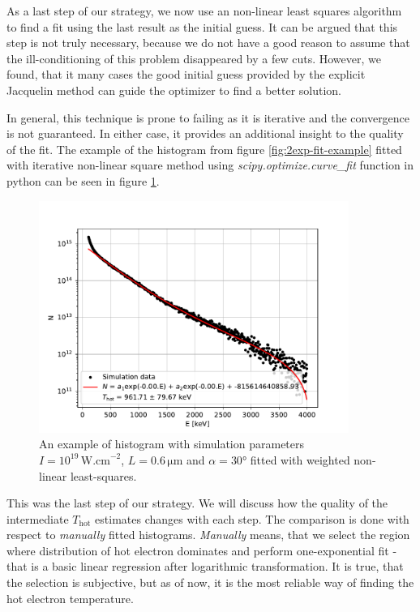 As a last step of our strategy, we now use an non-linear least squares algorithm to find a fit using the last result as the initial guess. It can be argued that this step is not truly necessary, because we do not have a good reason to assume that the ill-conditioning of this problem disappeared by a few cuts. However, we found, that it many cases the good initial guess provided by the explicit Jacquelin method can guide the optimizer to find a better solution. 

In general, this technique is prone to failing as it is iterative and the convergence is not guaranteed. In either case, it provides an additional insight to the quality of the fit. The example of the histogram from figure \ref{fig:2exp-fit-example} fitted with iterative non-linear square method using \textit{scipy.optimize.curve\_fit} function in python can be seen in figure \ref{fig:nlsq-fit-example}.
\begin{figure}[ht]
	\centering
	\includegraphics[width=0.9\textwidth]{figures/hist_1e19_060_30_nlsq}
	\caption{An example of histogram with simulation parameters $I=10^{19}\,\mathrm{W.cm}^{-2}$, $L=0.6\,\mathrm{\mu m}$ and $\alpha = 30$° fitted with weighted non-linear least-squares.}
	\label{fig:nlsq-fit-example}
\end{figure}

This was the last step of our strategy. We will discuss how the quality of the intermediate $T_{\mathrm{hot}}$ estimates changes with each step. The comparison is done with respect to \textit{manually} fitted histograms. \textit{Manually} means, that we select the region where distribution of hot electron dominates and perform one-exponential fit - that is a basic linear regression after logarithmic transformation. It is true, that the selection is subjective, but as of now, it is the most reliable way of finding the hot electron temperature.

